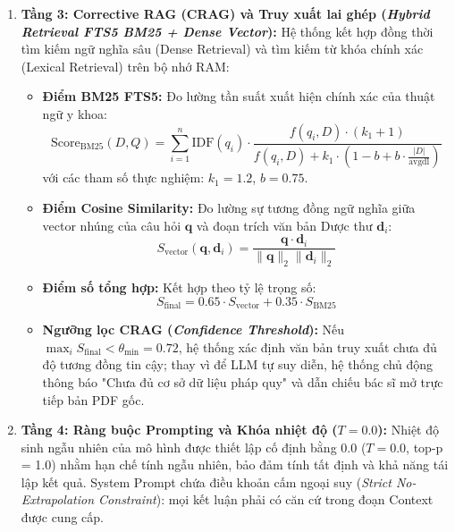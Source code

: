 \begin{enumerate}[leftmargin=2em]
    \item \textbf{Tầng 3: Corrective RAG (CRAG) và Truy xuất lai ghép (\textit{Hybrid Retrieval FTS5 BM25 + Dense Vector}):}
    Hệ thống kết hợp đồng thời tìm kiếm ngữ nghĩa sâu (Dense Retrieval) và tìm kiếm từ khóa chính xác (Lexical Retrieval) trên bộ nhớ RAM:
    \begin{itemize}[leftmargin=1.5em]
        \item \textbf{Điểm BM25 FTS5:} Đo lường tần suất xuất hiện chính xác của thuật ngữ y khoa:
        \begin{equation}
            \text{Score}_{\text{BM25}}(D, Q) = \sum_{i=1}^n \text{IDF}(q_i) \cdot \frac{f(q_i, D) \cdot (k_1 + 1)}{f(q_i, D) + k_1 \cdot \left(1 - b + b \cdot \frac{|D|}{\text{avgdl}}\right)}
        \end{equation}
        với các tham số thực nghiệm: $k_1 = 1.2$, $b = 0.75$.
        \item \textbf{Điểm Cosine Similarity:} Đo lường sự tương đồng ngữ nghĩa giữa vector nhúng của câu hỏi $\mathbf{q}$ và đoạn trích văn bản Dược thư $\mathbf{d}_i$:
        \begin{equation}
            S_{\text{vector}}(\mathbf{q}, \mathbf{d}_i) = \frac{\mathbf{q} \cdot \mathbf{d}_i}{\|\mathbf{q}\|_2 \|\mathbf{d}_i\|_2}
        \end{equation}
        \item \textbf{Điểm số tổng hợp:} Kết hợp theo tỷ lệ trọng số:
        \begin{equation}
            S_{\text{final}} = 0.65 \cdot S_{\text{vector}} + 0.35 \cdot S_{\text{BM25}}
        \end{equation}
        \item \textbf{Ngưỡng lọc CRAG (\textit{Confidence Threshold}):} Nếu $\max_i S_{\text{final}} < \theta_{\text{min}} = 0.72$, hệ thống xác định văn bản truy xuất chưa đủ độ tương đồng tin cậy; thay vì để LLM tự suy diễn, hệ thống chủ động thông báo "Chưa đủ cơ sở dữ liệu pháp quy" và dẫn chiếu bác sĩ mở trực tiếp bản PDF gốc.
    \end{itemize}

    \item \textbf{Tầng 4: Ràng buộc Prompting và Khóa nhiệt độ \texorpdfstring{($T = 0.0$)}{(T = 0.0)}:}
    Nhiệt độ sinh ngẫu nhiên của mô hình được thiết lập cố định bằng $0.0$ ($T = 0.0$, top-p = 1.0) nhằm hạn chế tính ngẫu nhiên, bảo đảm tính tất định và khả năng tái lập kết quả. System Prompt chứa điều khoản cấm ngoại suy (\textit{Strict No-Extrapolation Constraint}): mọi kết luận phải có căn cứ trong đoạn Context được cung cấp.


\end{enumerate}
